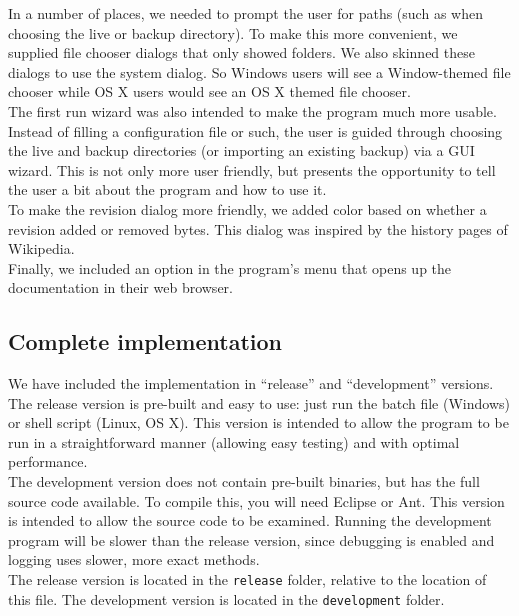 \documentclass[12pt,a4paper]{article}
\begin{document}
In a number of places, we needed to prompt the user for paths (such as when choosing the live or backup directory). To make this more convenient, we supplied file chooser dialogs that only showed folders. We also skinned these dialogs to use the system dialog. So Windows users will see a Window-themed file chooser while OS X users would see an OS X themed file chooser. \\

The first run wizard was also intended to make the program much more usable. Instead of filling a configuration file or such, the user is guided through choosing the live and backup directories (or importing an existing backup) via a GUI wizard. This is not only more user friendly, but presents the opportunity to tell the user a bit about the program and how to use it. \\

To make the revision dialog more friendly, we added color based on whether a revision added or removed bytes. This dialog was inspired by the history pages of Wikipedia\cite{wikipedia}. \\

Finally, we included an option in the program's menu that opens up the documentation in their web browser.

\subsection{Complete implementation}
We have included the implementation in ``release'' and ``development'' versions. \\

The release version is pre-built and easy to use: just run the batch file (Windows) or shell script (Linux, OS X). This version is intended to allow the program to be run in a straightforward manner (allowing easy testing) and with optimal performance. \\

The development version does not contain pre-built binaries, but has the full source code available. To compile this, you will need Eclipse\cite{eclipse} or Ant\cite{ant}. This version is intended to allow the source code to be examined. Running the development program will be slower than the release version, since debugging is enabled and logging uses slower, more exact methods. \\

The release version is located in the \texttt{release} folder, relative to the location of this file. The development version is located in the \texttt{development} folder.
\end{document}
